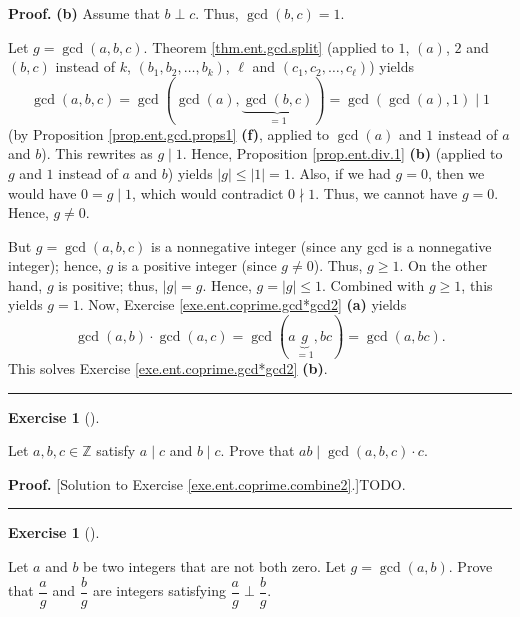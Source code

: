 \documentclass[numbers=enddot,12pt,final,onecolumn,notitlepage]{scrartcl}%
\newcounter{exer}
\numberwithin{exer}{subsection}
\theoremstyle{definition}
\newtheorem{exmp}[exer]{Exercise}
\newenvironment{exercise}[1][]
{\begin{exmp}[#1]\begin{leftbar}}
{\end{leftbar}\end{exmp}}
\newenvironment{proof}[1][Proof]{\noindent\textbf{#1.} }{\ \rule{0.5em}{0.5em}}
\begin{document}
\begin{proof}
\textbf{(b)} Assume that $b\perp c$. Thus, $\gcd\left(  b,c\right)  =1$.

Let $g=\gcd\left(  a,b,c\right)  $. Theorem \ref{thm.ent.gcd.split} (applied
to $1$, $\left(  a\right)  $, $2$ and $\left(  b,c\right)  $ instead of $k$,
$\left(  b_{1},b_{2},\ldots,b_{k}\right)  $, $\ell$ and $\left(  c_{1}%
,c_{2},\ldots,c_{\ell}\right)  $) yields%
\[
\gcd\left(  a,b,c\right)  =\gcd\left(  \gcd\left(  a\right)  ,\underbrace{\gcd
\left(  b,c\right)  }_{=1}\right)  =\gcd\left(  \gcd\left(  a\right)
,1\right)  \mid1
\]
(by Proposition \ref{prop.ent.gcd.props1} \textbf{(f)}, applied to
$\gcd\left(  a\right)  $ and $1$ instead of $a$ and $b$). This rewrites as
$g\mid1$. Hence, Proposition \ref{prop.ent.div.1} \textbf{(b)} (applied to $g$
and $1$ instead of $a$ and $b$) yields $\left\vert g\right\vert \leq\left\vert
1\right\vert =1$. Also, if we had $g=0$, then we would have $0=g\mid1$, which
would contradict $0\nmid1$. Thus, we cannot have $g=0$. Hence, $g\neq0$.

But $g=\gcd\left(  a,b,c\right)  $ is a nonnegative integer (since any gcd is
a nonnegative integer); hence, $g$ is a positive integer (since $g\neq0$).
Thus, $g\geq1$. On the other hand, $g$ is positive; thus, $\left\vert
g\right\vert =g$. Hence, $g=\left\vert g\right\vert \leq1$. Combined with
$g\geq1$, this yields $g=1$. Now, Exercise \ref{exe.ent.coprime.gcd*gcd2}
\textbf{(a)} yields
\[
\gcd\left(  a,b\right)  \cdot\gcd\left(  a,c\right)  =\gcd\left(
a\underbrace{g}_{=1},bc\right)  =\gcd\left(  a,bc\right)  .
\]
This solves Exercise \ref{exe.ent.coprime.gcd*gcd2} \textbf{(b)}.
\end{proof}

\begin{exercise}
\label{exe.ent.coprime.combine2}Let $a,b,c\in\mathbb{Z}$ satisfy $a\mid c$ and
$b\mid c$. Prove that $ab\mid\gcd\left(  a,b,c\right)  \cdot c$.
\end{exercise}

\begin{proof}
[Solution to Exercise \ref{exe.ent.coprime.combine2}.]TODO.
\end{proof}

\begin{exercise}
\label{exe.ent.coprime.a/g}Let $a$ and $b$ be two integers that are not both
zero. Let $g=\gcd\left(  a,b\right)  $. Prove that $\dfrac{a}{g}$ and
$\dfrac{b}{g}$ are integers satisfying $\dfrac{a}{g}\perp\dfrac{b}{g}$.
\end{exercise}
\end{document}
